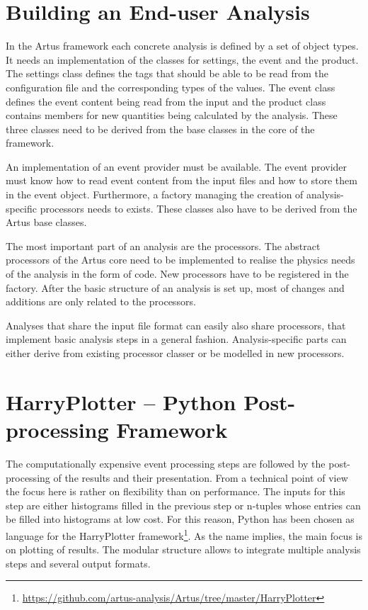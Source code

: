 \documentclass[3p]{elsarticle}
\begin{document}
\section{Building an End-user Analysis \label{section_artus_analysis}}

In the Artus framework each concrete analysis is defined by a set of object types. It needs an implementation of the classes for settings, the event and the product. The settings class defines the tags that should be able to be read from the configuration file and the corresponding types of the values. The event class defines the event content being read from the input and the product class contains members for new quantities being calculated by the analysis. These three classes need to be derived from the base classes in the core of the framework.

An implementation of an event provider must be available. The event provider must know how to read event content from the input files and how to store them in the event object. Furthermore, a factory managing the creation of analysis-specific processors needs to exists. These classes also have to be derived from the Artus base classes.

The most important part of an analysis are the processors. The abstract processors of the Artus core need to be implemented to realise the physics needs of the analysis in the form of code. New processors have to be registered in the factory. After the basic structure of an analysis is set up, most of changes and additions are only related to the processors.

Analyses that share the input file format can easily also share processors, that implement basic analysis steps in a general fashion. Analysis-specific parts can either derive from existing processor classer or be modelled in new processors.


\section{HarryPlotter -- Python Post-processing Framework \label{section_artus_harryplotter}}

The computationally expensive event processing steps are followed by the post-processing of the results and their presentation. From a technical point of view the focus here is rather on flexibility than on performance. The inputs for this step are either histograms filled in the previous step or n-tuples whose entries can be filled into histograms at low cost. For this reason, Python has been chosen as language for the HarryPlotter framework\footnote{\url{https://github.com/artus-analysis/Artus/tree/master/HarryPlotter}}. As the name implies, the main focus is on plotting of results. The modular structure allows to integrate multiple analysis steps and several output formats.
\end{document}
